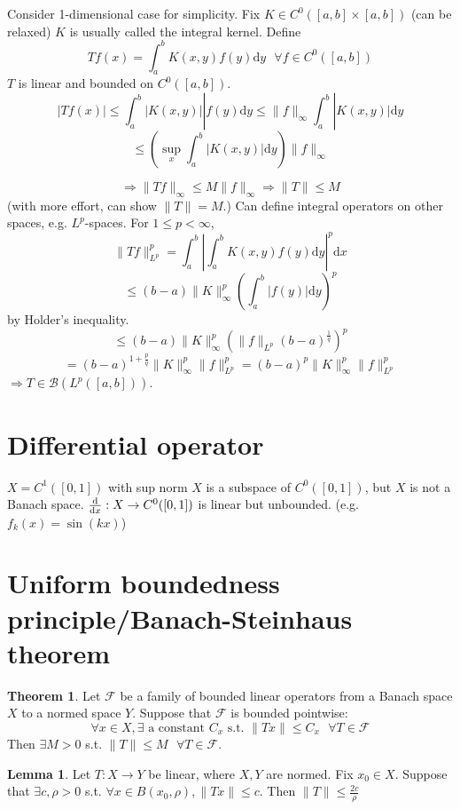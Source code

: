 \documentclass{article}
\newcommand{\sfa}{\text{  } \forall}
\theoremstyle{definition}
\newtheorem{thm}{Theorem}
\newtheorem{lem}{Lemma}
\begin{document}
Consider 1-dimensional case for simplicity.
Fix $K \in C^0([a, b] \times [a, b])$ (can be relaxed)
$K$ is usually called the integral kernel.
Define 
\[
	T f(x) = \int_a^b K(x, y) f(y) \mathrm{d} y \sfa f \in C^0([a, b])
\]
$T$ is linear and bounded on $C^0([a, b])$.
\[
	|T f(x)| \leq \int_a^b |K(x, y)||f(y) \mathrm{d} y \leq \|f\|_\infty \int_a^b |K(x, y)| \mathrm{d} y
\]
\[
	\leq (\sup_x \int_a^b |K(x, y)| \mathrm{d} y) \|f\|_\infty
\]

\[
	\Rightarrow \|T f \|_\infty \leq M \|f\|_\infty \Rightarrow \|T\| \leq M
\]
(with more effort, can show $\|T\| = M$.)
Can define integral operators on other spaces, e.g. $L^p$-spaces.
For $1 \leq p < \infty$, 
\[
	\|T f\|_{L^p}^p = \int_a^b \left|\int_a^b K(x, y) f(y) \mathrm{d} y\right|^p \mathrm{d} x
\]
\[
	\leq (b- a) \|K\|_\infty^p\left(\int_a^b |f(y)| \mathrm{d} y \right)^p
\]
by Holder's inequality.
\[
	\leq (b - a) \|K\|_\infty^p \left( \|f\|_{L^p} (b - a)^{\frac{1}{q}} \right)^p
\]
\[
	= (b - a)^{1 + \frac{p}{q}} \|K\|_\infty^p \|f\|_{L^p}^p = (b - a)^p \|K\|_\infty^p \|f\|_{L^p}^p
\]
$\Rightarrow T \in \mathcal{B}(L^p([a, b]))$.

\section*{Differential operator}

$X = C^1([0, 1])$ with sup norm
$X$ is a subspace of $C^0([0, 1])$, but $X$ is not a Banach space.
$\dv{x}: X \to C^0([0, 1])$ is linear but unbounded. (e.g. $f_k(x) = \sin(kx)$)

\section*{Uniform boundedness principle/Banach-Steinhaus theorem}

\begin{thm}
	Let $\mathcal{F}$ be a family of bounded linear operators from a Banach space $X$ to a normed space $Y$.
	Suppose that $\mathcal{F}$ is bounded pointwise:
	\[
		\forall x \in X, \exists \text{ a constant } C_x \text{ s.t. }\|T x\| \leq C_x \sfa T \in \mathcal{F}
	\]
	Then $\exists M > 0$ s.t. $\|T\| \leq M \sfa T \in \mathcal{F}$.
\end{thm}

\begin{lem}
	Let $T:X \to Y$ be linear, where $X, Y$ are normed.
	Fix $x_0 \in X$. Suppose that $\exists c, \rho > 0$ s.t. $\forall x \in B(x_0, \rho), \|T x\| \leq c$.
	Then $\|T\| \leq \frac{2c}{\rho}$
\end{lem}
\end{document}
